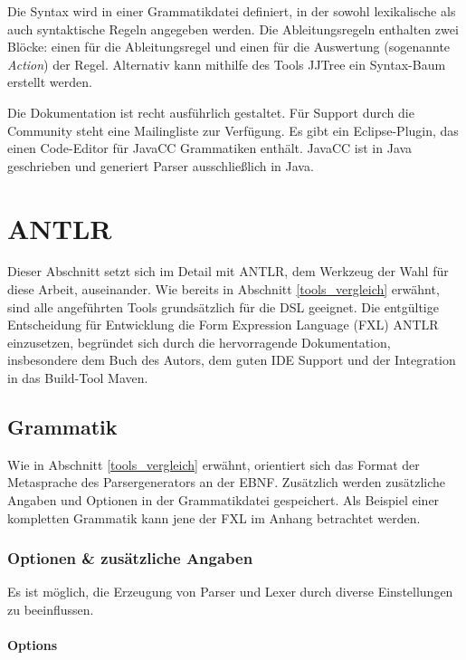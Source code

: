 Die Syntax wird in einer Grammatikdatei definiert, in der sowohl lexikalische als auch syntaktische Regeln angegeben werden. Die Ableitungsregeln enthalten zwei Blöcke: einen für die Ableitungsregel und einen für die Auswertung (sogenannte \emph{Action}) der Regel. Alternativ kann mithilfe des Tools JJTree ein Syntax-Baum erstellt werden.

Die Dokumentation ist recht ausführlich gestaltet. Für Support durch die Community steht eine Mailingliste zur Verfügung. Es gibt ein Eclipse-Plugin, das einen Code-Editor für JavaCC Grammatiken enthält. JavaCC ist in Java geschrieben und generiert Parser ausschließlich in Java.





\section{ANTLR}
\label{tools_antlr}
Dieser Abschnitt setzt sich im Detail mit ANTLR, dem Werkzeug der Wahl für diese Arbeit, auseinander. Wie bereits in Abschnitt \ref{tools_vergleich} erwähnt, sind alle angeführten Tools grundsätzlich für die DSL geeignet. Die entgültige Entscheidung für Entwicklung die Form Expression Language (FXL) ANTLR einzusetzen, begründet sich durch die hervorragende Dokumentation, insbesondere dem Buch des Autors, dem guten IDE Support und der Integration in das Build-Tool Maven.


\subsection{Grammatik}

Wie in Abschnitt \ref{tools_vergleich} erwähnt, orientiert sich das Format der Metasprache des Parsergenerators an der EBNF. Zusätzlich werden zusätzliche Angaben und Optionen in der Grammatikdatei gespeichert. Als Beispiel einer kompletten Grammatik kann jene der FXL im Anhang betrachtet werden.

\subsubsection{Optionen \& zusätzliche Angaben}

Es ist möglich, die Erzeugung von Parser und Lexer durch diverse Einstellungen zu beeinflussen.

\paragraph{Options}

